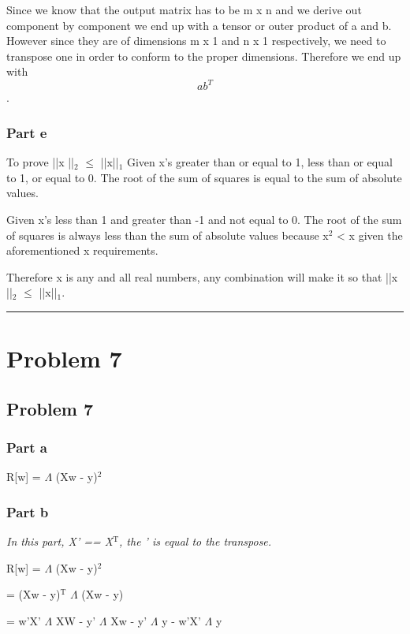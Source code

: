\documentclass[11pt]{article}
\begin{document}
Since we know that the output matrix has to be m x n and we derive out component by component we end up with a tensor or outer product of a and b. However since they are of dimensions m x 1 and n x 1 respectively, we need to transpose one in order to conform to the proper dimensions. Therefore we end up with $$ ab^T $$.

\subsubsection{Part e}
\label{sec-6-1-5}
To prove ||x ||$_{\text{2}}$ $\le$ ||x||$_{\text{1}}$
Given x's greater than or equal to 1, less than or equal to 1, or equal to 0. The root of the sum of squares is equal to the sum of absolute values.

Given x's less than 1 and greater than -1 and not equal to 0. The root of the sum of squares is always less than the sum of absolute values because x$^{\text{2}}$ < x given the aforementioned x requirements.

Therefore x is any and all real numbers, any combination will make it so that ||x ||$_{\text{2}}$ $\le$ ||x||$_{\text{1}}$.

\rule{\linewidth}{0.5pt}
\section{Problem 7}
\label{sec-7}

\subsection{Problem 7}
\label{sec-7-1}
\subsubsection{Part a}
\label{sec-7-1-1}

R[w] = $\Lambda$ (Xw - y)$^{\text{2}}$

\subsubsection{Part b}
\label{sec-7-1-2}
\emph{In this part, X' == X$^{\text{T}}$, the ' is equal to the transpose.}

R[w] = $\Lambda$ (Xw - y)$^{\text{2}}$

= (Xw - y)$^{\text{T}}$ $\Lambda$ (Xw - y)

= w'X' $\Lambda$ XW - y' $\Lambda$ Xw - y' $\Lambda$ y - w'X' $\Lambda$ y
\end{document}
